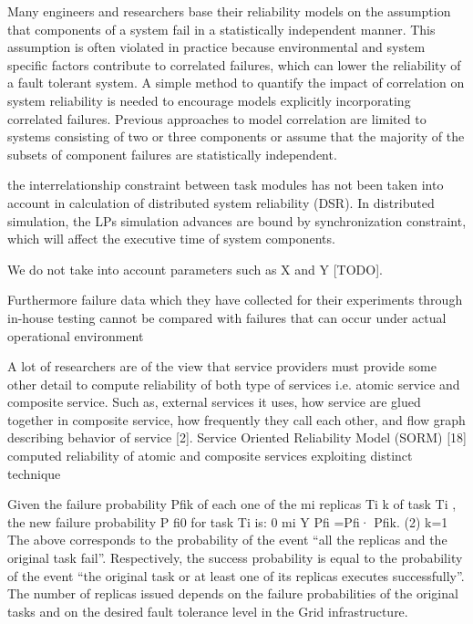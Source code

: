 \documentclass{cslthse-msc}
\begin{document}
Many engineers and researchers base their reliability models on the assumption that components of a system fail in a statistically independent manner. This assumption is often violated in practice because environmental and system specific factors contribute to correlated failures, which can lower the reliability of a fault tolerant system. A simple method to quantify the impact of correlation on system reliability is needed to encourage models explicitly incorporating correlated failures. Previous approaches to model correlation are limited to systems consisting of two or three components or assume that the majority of the subsets of component failures are statistically independent. \cite{discContRelModel}

the interrelationship constraint between task modules has not been taken into account in calculation of distributed system reliability (DSR). In distributed simulation, the LPs simulation advances are bound by synchronization constraint, which will affect the executive time of system components. \cite{relModelDistSimSystem}

We do not take into account parameters such as X and Y [TODO].

Furthermore failure data which they have collected for their experiments through in-house testing cannot be compared with failures that can occur under actual operational environment \cite{surveyReliabilityDistr}

A lot of researchers are of the view that service providers must provide some other detail to compute reliability of both type of services i.e. atomic service and composite service. Such as, external services it uses, how service are glued together in composite service, how frequently they call each other, and flow graph describing behavior of service [2]. Service Oriented Reliability Model (SORM) [18] computed reliability of atomic and composite services exploiting distinct technique \cite{surveyReliabilityDistr}

Given the failure probability Pfik of each one of the mi replicas Ti k of task Ti , the new failure probability P fi0 for task Ti is:
0 mi Y
Pfi =Pfi· Pfik. (2) k=1
The above corresponds to the probability of the event “all the replicas and the original task fail”. Respectively, the success probability is equal to the probability of the event “the original task or at least one of its replicas executes successfully”. The number of replicas issued depends on the failure probabilities of the original tasks and on the desired fault tolerance level in the Grid infrastructure.  \cite{effTaskReplMobGrid}
\fi
\end{document}
